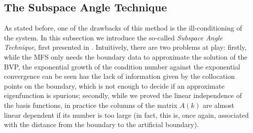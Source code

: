 \subsection{The Subspace Angle Technique}

As stated before, one of the drawbacks of this method is the ill-conditioning of the system. In this subsection we introduce the so-called \textit{Subspace Angle Technique}, first presented in \cite{betcke2005reviving}. Intuitively, there are two problems at play: firstly, while the MFS only needs the boundary data to approximate the solution of the \ac{BVP}, the exponential growth of the condition number against the exponential convergence can be seen has the lack of information given by the collocation points on the boundary, which is not enough to decide if an approximate eigenfunction is spurious; secondly, while we proved the linear independence of the basis functions, in practice the columns of the matrix \(A(k)\) are almost linear dependent if its number is too large (in fact, this is, once again, associated with the distance from the boundary to the artificial boundary).


